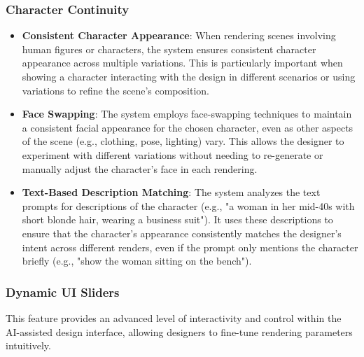 \documentclass{article}
\begin{document}
\subsubsection{Character Continuity}
\begin{itemize}
\item \textbf{Consistent Character Appearance}: When rendering scenes involving human figures or characters, the system ensures consistent character appearance across multiple variations. This is particularly important when showing a character interacting with the design in different scenarios or using variations to refine the scene's composition.
\item \textbf{Face Swapping}: The system employs face-swapping techniques to maintain a consistent facial appearance for the chosen character, even as other aspects of the scene (e.g., clothing, pose, lighting) vary. This allows the designer to experiment with different variations without needing to re-generate or manually adjust the character's face in each rendering.
\item \textbf{Text-Based Description Matching}: The system analyzes the text prompts for descriptions of the character (e.g., "a woman in her mid-40s with short blonde hair, wearing a business suit"). It uses these descriptions to ensure that the character's appearance consistently matches the designer's intent across different renders, even if the prompt only mentions the character briefly (e.g., "show the woman sitting on the bench").
\end{itemize}

\subsubsection{Dynamic UI Sliders}

This feature provides an advanced level of interactivity and control within the AI-assisted design interface, allowing designers to fine-tune rendering parameters intuitively.
\end{document}
